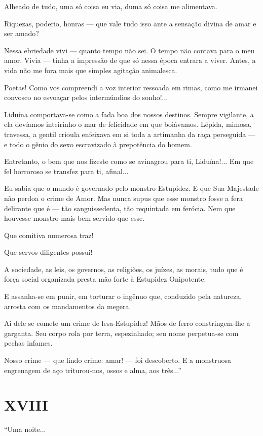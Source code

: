 Alheado de tudo, uma só coisa eu via, duma só coisa me alimentava.

Riquezas, poderio, honras --- que vale tudo isso ante a sensação divina
de amar e ser amado?

Nessa ebriedade vivi --- quanto tempo não sei. O tempo não contava para
o meu amor. Vivia --- tinha a impressão de que só nessa época entrara a
viver. Antes, a vida não me fora mais que simples agitação animalesca.

Poetas! Como vos compreendi a voz interior ressoada em rimas, como me
irmanei convosco no esvoaçar pelos intermúndios do sonho!...

Liduína comportava-se como a fada boa dos nossos destinos. Sempre
vigilante, a ela devíamos inteirinho o mar de felicidade em que
boiávamos. Lépida, mimosa, travessa, a gentil crioula enfeixava em si
toda a artimanha da raça perseguida --- e todo o gênio do sexo
escravizado à prepotência do homem.

Entretanto, o bem que nos fizeste como se avinagrou para ti, Liduína!...
Em que fel horroroso se transfez para ti, afinal...

Eu sabia que o mundo é governado pelo monstro Estupidez. E que Sua
Majestade não perdoa o crime de Amor. Mas nunca supus que esse monstro
fosse a fera delirante que é --- tão sanguissedenta, tão requintada em
ferócia. Nem que houvesse monstro mais bem servido que esse.

Que comitiva numerosa traz!

Que servos diligentes possui!

A sociedade, as leis, os governos, as religiões, os juízes, as morais,
tudo que é força social organizada presta mão forte à Estupidez
Onipotente.

E assanha-se em punir, em torturar o ingênuo que, conduzido pela
natureza, arrosta com os mandamentos da megera.

Ai dele se comete um crime de lesa-Estupidez! Mãos de ferro
constringem-lhe a garganta. Seu corpo rola por terra, espezinhado; seu
nome perpetua-se com pechas infames.

Nosso crime --- que lindo crime: amar! --- foi descoberto. E a
monstruosa engrenagem de aço triturou-nos, ossos e alma, aos três...''

\section{XVIII}

``Uma noite...

